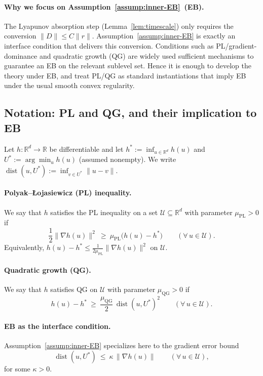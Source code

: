 \documentclass{article}
\newcommand{\1}{\mathbf{1}}
\begin{document}
\paragraph{Why we focus on Assumption~\ref{assump:inner-EB}~(EB).}
The Lyapunov absorption step (Lemma~\ref{lem:timescale}) only requires the conversion
$\|D\|\le C\|r\|$.
Assumption~\ref{assump:inner-EB} is exactly an interface condition that delivers this conversion.
Conditions such as PL/gradient-dominance and quadratic growth (QG) are widely used sufficient mechanisms
to guarantee an EB on the relevant sublevel set.
Hence it is enough to develop the theory under EB, and treat PL/QG as standard instantiations that imply EB
under the usual smooth convex regularity.

\subsection{Notation: PL and QG, and their implication to EB}\label{app:pl-qg-eb}

Let $h:\mathbb R^{d}\to\mathbb R$ be differentiable and let
$h^*:=\inf_{u\in\mathbb R^d} h(u)$ and $U^*:=\arg\min_u h(u)$ (assumed nonempty).
We write $\operatorname{dist}(u,U^*):=\inf_{v\in U^*}\|u-v\|$.

\paragraph{Polyak--\L{}ojasiewicz (PL) inequality.}
We say that $h$ satisfies the PL inequality on a set $\mathcal U\subseteq\mathbb R^d$ with parameter $\mu_{\mathrm{PL}}>0$ if
\begin{equation}\label{eq:PL-def}
\frac{1}{2}\|\nabla h(u)\|^2 \ \ge\ \mu_{\mathrm{PL}}\bigl(h(u)-h^*\bigr)
\qquad(\forall\,u\in\mathcal U).
\end{equation}
Equivalently, $h(u)-h^* \le \frac{1}{2\mu_{\mathrm{PL}}}\|\nabla h(u)\|^2$ on $\mathcal U$.

\paragraph{Quadratic growth (QG).}
We say that $h$ satisfies QG on $\mathcal U$ with parameter $\mu_{\mathrm{QG}}>0$ if
\begin{equation}\label{eq:QG-def}
h(u)-h^* \ \ge\ \frac{\mu_{\mathrm{QG}}}{2}\,\operatorname{dist}(u,U^*)^2
\qquad(\forall\,u\in\mathcal U).
\end{equation}

\paragraph{EB as the interface condition.}
Assumption~\ref{assump:inner-EB} specializes here to the gradient error bound
\begin{equation}\label{eq:EB-def-app}
\operatorname{dist}(u,U^*) \ \le\ \kappa\,\|\nabla h(u)\|
\qquad(\forall\,u\in\mathcal U),
\end{equation}
for some $\kappa>0$.
\end{document}
